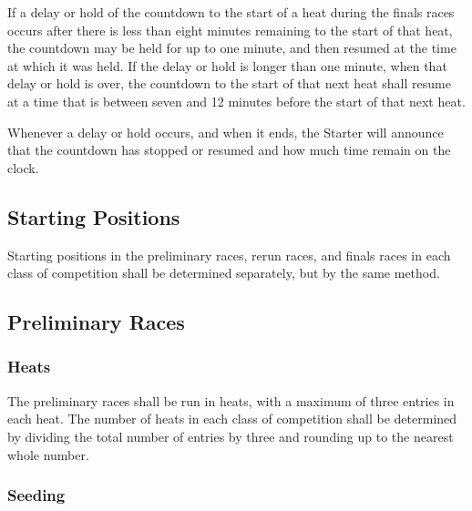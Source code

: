 	If a delay or hold of the countdown to the start of a heat during the finals
	races occurs after there is less than eight minutes remaining to the start of
	that heat, the countdown may be held for up to one minute, and then resumed at
	the time at which it was held. If the delay or hold is longer than one minute,
	when that delay or hold is over, the countdown to the start of that next heat
	shall resume at a time that is between seven and 12 minutes before the start of
	that next heat.

	Whenever a delay or hold occurs, and when it ends, the Starter will announce that the countdown
	has stopped or resumed and how much time remain on the clock.

\subsection{Starting Positions}

	Starting positions in the preliminary races, rerun races, and finals races in
	each class of competition shall be determined separately, but by the same
	method.

\subsection{Preliminary Races}

\subsubsection{Heats}

	The preliminary races shall be run in heats, with a maximum of three entries in
	each heat. The number of heats in each class of competition shall be determined
	by dividing the total number of entries by three and rounding up to the nearest
	whole number.

\subsubsection{Seeding}


